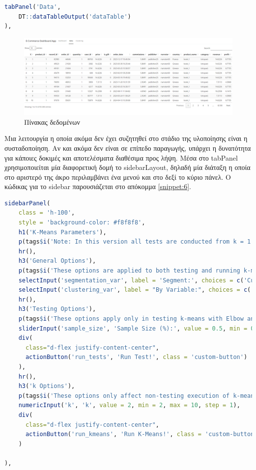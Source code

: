 \documentclass{article}
\begin{document}
\begin{lstlisting}[language=R, caption=Κώδικας για τον πίνακα δεδομένων, label={snippet:5}]
tabPanel('Data',       
    DT::dataTableOutput('dataTable')
),
\end{lstlisting}

\begin{figure}[h]
    \centering
    \includegraphics[width=\textwidth]{pictures/13_data_table.png}
    \caption{Πίνακας δεδομένων}
    \label{fig:13}
\end{figure}

Μια λειτουργία η οποία ακόμα δεν έχει συζητηθεί στο στάδιο της υλοποίησης είναι η συσταδοποίηση. Αν και ακόμα δεν είναι σε επίπεδο παραγωγής, υπάρχει η δυνατότητα για κάποιες δοκιμές και αποτελέσματα διαθέσιμα προς λήψη. Μέσα στο tabPanel χρησιμοποιείται μία διαφορετική δομή το sidebarLayout, δηλαδή μία διάταξη η οποία στο αριστερό της άκρο περιλαμβάνει ένα μενού και στο δεξί το κύριο πάνελ. Ο κώδικας για το sidebar παρουσιάζεται στο απόκομμα \ref{snippet:6}.

\begin{lstlisting}[language=R, caption=Κώδικας του sidebar, label={snippet:6}]
sidebarPanel(
    class = 'h-100',
    style = 'background-color: #f8f8f8',
    h1('K-Means Parameters'),
    p(tags$i('Note: In this version all tests are conducted from k = 1 to 10')),
    hr(),
    h3('General Options'),
    p(tags$i('These options are applied to both testing and running k-means')),
    selectInput('segmentation_var', label = 'Segment:', choices = c('Customers' = 'user_id', 'Orders' = 'order_id')),
    selectInput('clustering_var', label = "By Variable:", choices = c('Category' = 'category', 'Narrator' = 'narrator')),
    hr(),
    h3('Testing Options'),
    p(tags$i('These options apply only in testing k-means with Elbow and Silhouette Method')),
    sliderInput('sample_size', 'Sample Size (%):', value = 0.5, min = 0, max = 1, step = 0.01),
    div(
      class="d-flex justify-content-center",
      actionButton('run_tests', 'Run Test!', class = 'custom-button')
    ),
    hr(),
    h3('k Options'),
    p(tags$i('These options only affect non-testing execution of k-means')),
    numericInput('k', 'k', value = 2, min = 2, max = 10, step = 1),
    div(
      class="d-flex justify-content-center",
      actionButton('run_kmeans', 'Run K-Means!', class = 'custom-button')
    )
    
),
\end{lstlisting}
\end{document}
